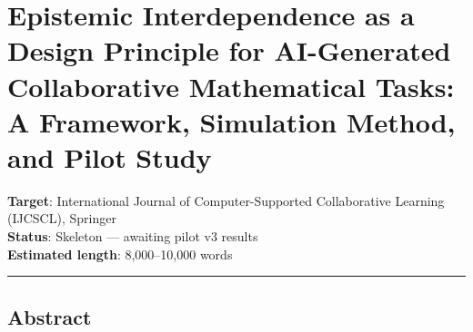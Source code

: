 \documentclass[
  11pt,
]{article}
\author{}
\date{}
\begin{document}
\section{Epistemic Interdependence as a Design Principle for
AI-Generated Collaborative Mathematical Tasks: A Framework, Simulation
Method, and Pilot
Study}\label{epistemic-interdependence-as-a-design-principle-for-ai-generated-collaborative-mathematical-tasks-a-framework-simulation-method-and-pilot-study}

\textbf{Target}: International Journal of Computer-Supported
Collaborative Learning (IJCSCL), Springer\\
\textbf{Status}: Skeleton --- awaiting pilot v3 results\\
\textbf{Estimated length}: 8,000--10,000 words

\begin{center}\rule{0.5\linewidth}{0.5pt}\end{center}

\subsection{Abstract}\label{abstract}
\end{document}

